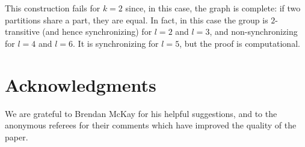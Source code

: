 \documentclass{daj}
\theoremstyle{plain}
\theoremstyle{definition}
\begin{document}
This construction fails for $k=2$ since, in this case, the graph is complete:
if two partitions share a part, they are equal. In fact, in this case the
group is $2$-transitive (and hence synchronizing) for $l=2$ and $l=3$, and
non-synchronizing for $l=4$ and $l=6$. It is synchronizing for $l=5$, but the
proof is computational.



\section*{Acknowledgments} %
We are grateful to Brendan McKay for his helpful suggestions, and to the anonymous referees for their comments which have improved the quality of the paper.

\end{document}
